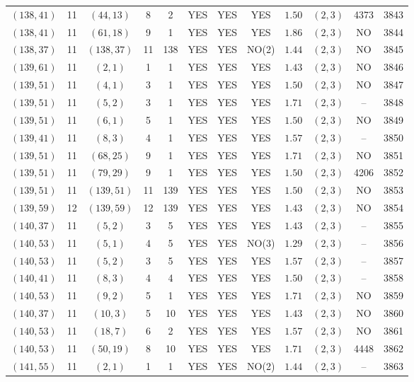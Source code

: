 \begin{longtable}{|c|c|c|c|c|c|c|c|c|c|c|c|}
$(138,41)$ & 11 & $(44,13)$ & 8 & 2 & YES & YES & YES & $1.50$ & $(2,3)$ & 4373 & 3843\\
$(138,41)$ & 11 & $(61,18)$ & 9 & 1 & YES & YES & YES & $1.86$ & $(2,3)$ & NO & 3844\\
$(138,37)$ & 11 & $(138,37)$ & 11 & 138 & YES & YES & NO(2) & $1.44$ & $(2,3)$ & NO & 3845\\
$(139,61)$ & 11 & $(2,1)$ & 1 & 1 & YES & YES & YES & $1.43$ & $(2,3)$ & NO & 3846\\
$(139,51)$ & 11 & $(4,1)$ & 3 & 1 & YES & YES & YES & $1.50$ & $(2,3)$ & NO & 3847\\
$(139,51)$ & 11 & $(5,2)$ & 3 & 1 & YES & YES & YES & $1.71$ & $(2,3)$ & -- & 3848\\
$(139,51)$ & 11 & $(6,1)$ & 5 & 1 & YES & YES & YES & $1.50$ & $(2,3)$ & NO & 3849\\
$(139,41)$ & 11 & $(8,3)$ & 4 & 1 & YES & YES & YES & $1.57$ & $(2,3)$ & -- & 3850\\
$(139,51)$ & 11 & $(68,25)$ & 9 & 1 & YES & YES & YES & $1.71$ & $(2,3)$ & NO & 3851\\
$(139,51)$ & 11 & $(79,29)$ & 9 & 1 & YES & YES & YES & $1.50$ & $(2,3)$ & 4206 & 3852\\
$(139,51)$ & 11 & $(139,51)$ & 11 & 139 & YES & YES & YES & $1.50$ & $(2,3)$ & NO & 3853\\
$(139,59)$ & 12 & $(139,59)$ & 12 & 139 & YES & YES & YES & $1.43$ & $(2,3)$ & NO & 3854\\
$(140,37)$ & 11 & $(5,2)$ & 3 & 5 & YES & YES & YES & $1.43$ & $(2,3)$ & -- & 3855\\
$(140,53)$ & 11 & $(5,1)$ & 4 & 5 & YES & YES & NO(3) & $1.29$ & $(2,3)$ & -- & 3856\\
$(140,53)$ & 11 & $(5,2)$ & 3 & 5 & YES & YES & YES & $1.57$ & $(2,3)$ & -- & 3857\\
$(140,41)$ & 11 & $(8,3)$ & 4 & 4 & YES & YES & YES & $1.50$ & $(2,3)$ & -- & 3858\\
$(140,53)$ & 11 & $(9,2)$ & 5 & 1 & YES & YES & YES & $1.71$ & $(2,3)$ & NO & 3859\\
$(140,37)$ & 11 & $(10,3)$ & 5 & 10 & YES & YES & YES & $1.43$ & $(2,3)$ & NO & 3860\\
$(140,53)$ & 11 & $(18,7)$ & 6 & 2 & YES & YES & YES & $1.57$ & $(2,3)$ & NO & 3861\\
$(140,53)$ & 11 & $(50,19)$ & 8 & 10 & YES & YES & YES & $1.71$ & $(2,3)$ & 4448 & 3862\\
$(141,55)$ & 11 & $(2,1)$ & 1 & 1 & YES & YES & NO(2) & $1.44$ & $(2,3)$ & -- & 3863\\

\end{longtable}
